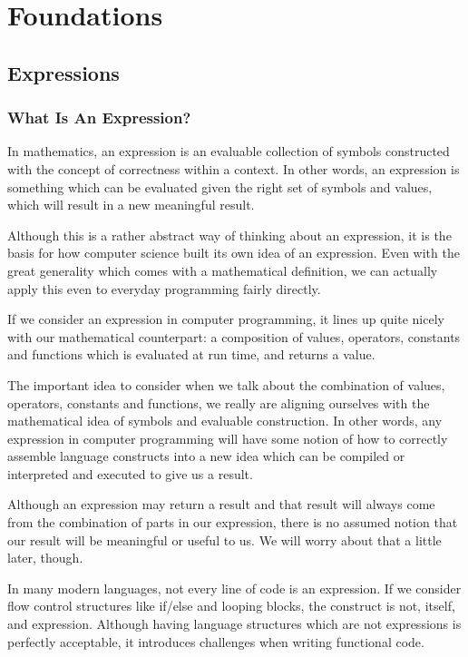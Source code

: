 \documentclass[a4paper,12pt,twoside]{book}
\begin{document}
\chapter{Foundations}

\section{Expressions}
\subsection{What Is An Expression?}
 
 In mathematics, an expression is an evaluable collection of symbols constructed with the concept of correctness within a context.  In other words, an expression is something which can be evaluated given the right set of symbols and values, which will result in a new meaningful result.
 
 Although this is a rather abstract way of thinking about an expression, it is the basis for how computer science built its own idea of an expression.  Even with the great generality which comes with a mathematical definition, we can actually apply this even to everyday programming fairly directly.
 
 If we consider an expression in computer programming, it lines up quite nicely with our mathematical counterpart: a composition of values, operators, constants and functions which is evaluated at run time, and returns a value.
 
 The important idea to consider when we talk about the combination of values, operators, constants and functions, we really are aligning ourselves with the mathematical idea of symbols and evaluable construction.  In other words, any expression in computer programming will have some notion of how to correctly assemble language constructs into a new idea which can be compiled or interpreted and executed to give us a result.
 
 Although an expression may return a result and that result will always come from the combination of parts in our expression, there is no assumed notion that our result will be meaningful or useful to us.  We will worry about that a little later, though.
 
 In many modern languages, not every line of code is an expression.  If we consider flow control structures like if/else and looping blocks, the construct is not, itself, and expression.  Although having language structures which are not expressions is perfectly acceptable, it introduces challenges when writing functional code.
 
\end{document}
